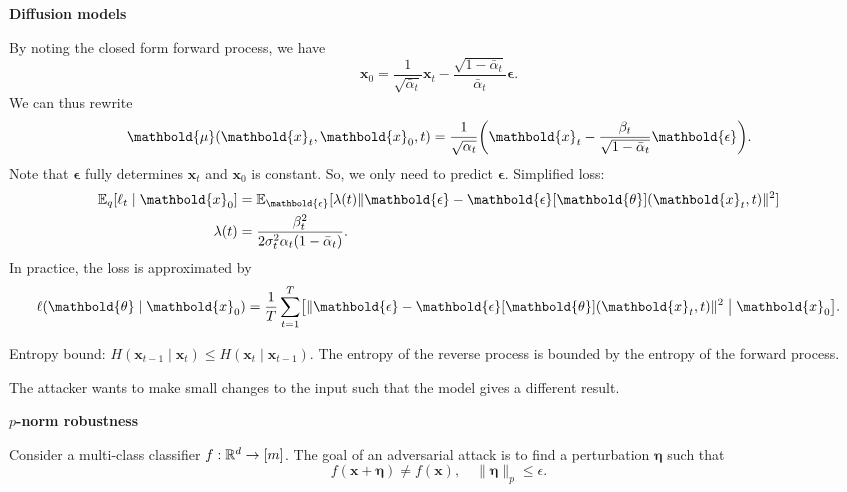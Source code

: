 \documentclass[10pt]{article}
\newenvironment{topic}[1]
{\textbf{\sffamily \footnotesize \colorbox{black}{\rlap{\textbf{\textcolor{white}{#1}}}\hspace{\linewidth}\hspace{-2\fboxsep}}}}
{}
\newenvironment{subtopic}[1]
{\begin{center}\textbf{\footnotesize \sffamily #1}\end{center}}
{}
\renewcommand{\vec}[1]{\ensuremath{\mathbold{#1}}}
\begin{document}
\begin{multicols*}{3}
\begin{topic}{Generative models}
\begin{subtopic}{Diffusion models}
            By noting the closed form forward process, we have \[
                \vec{x}_0 = \frac{1}{\sqrt{\bar{\alpha}_t}} \vec{x}_t - \frac{\sqrt{1-\bar{\alpha}_t}}{\bar{\alpha}_t} \vec{\epsilon}.
            \]
            We can thus rewrite \[
                \vec{\mu}(\vec{x}_t, \vec{x}_0, t) = \frac{1}{\sqrt{\alpha_t}} \lft( \vec{x}_t - \frac{\beta_t}{\sqrt{1-\bar{\alpha}_t}} \vec{\epsilon} \rgt).
            \]
            Note that $\vec{\epsilon}$ fully determines $\vec{x}_t$ and $\vec{x}_0$ is constant. So, we only
            need to predict $\vec{\epsilon}$. Simplified loss:
            \begin{align*}
                \E_q[\ell_t \mid \vec{x}_0] & = \E_{\vec{\epsilon}}[\lambda(t) \| \vec{\epsilon} - \vec{\epsilon}[\vec{\theta}](\vec{x}_t, t) \|^2] \\
                \lambda(t)                  & = \frac{\beta_t^2}{2 \sigma_t^2 \alpha_t (1-\bar{\alpha}_t)}.
            \end{align*}
            In practice, the loss is approximated by \[
                \ell(\vec{\theta} \mid \vec{x}_0) = \frac{1}{T} \sum_{t=1}^{T} \lft[ \| \vec{\epsilon} - \vec{\epsilon}[\vec{\theta}](\vec{x}_t, t) \|^2 \;\middle|\; \vec{x}_0 \rgt].
            \]

            Entropy bound: $H(\vec{x}_{t-1} \mid \vec{x}_t) \leq H(\vec{x}_t \mid \vec{x}_{t-1})$.
            The entropy of the reverse process is bounded by the entropy of the forward process.
        \end{subtopic}

    \end{topic}

    \begin{topic}{Adversarial attacks}

        The attacker wants to make small changes to the input such that the model gives a different result.

        \begin{subtopic}{$p$-norm robustness}
            Consider a multi-class classifier $f: \mathbb{R}^d \to [m]$. The goal of an adversarial attack is to find a perturbation $\vec{\eta}$ such that \[
                f(\vec{x} + \vec{\eta}) \neq f(\vec{x}), \quad \| \vec{\eta} \|_p \leq \epsilon.
            \]


\end{subtopic}
\end{topic}
\end{multicols*}
\end{document}
